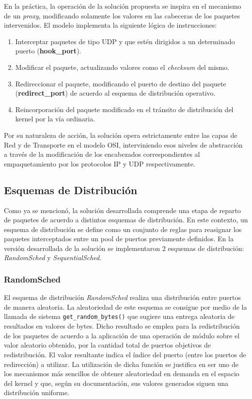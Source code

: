 En la práctica, la operación de la solución propuesta se inspira en el mecanismo de un \emph{proxy}, modificando solamente los valores en las cabeceras de los paquetes intervenidos. El modelo implementa la siguiente lógica de instrucciones:

\begin{enumerate}
\item Interceptar paquetes de tipo UDP y que estén dirigidos a un determinado puerto (\textbf{hook\_port}).
\item Modificar el paquete, actualizando valores como el \emph{checksum} del mismo.
\item Redireccionar el paquete, modificando el puerto de destino del paquete (\textbf{redirect\_port}) de acuerdo al esquema de distribución operativo.
\item Reincorporación del paquete modificado en el tránsito de distribución del kernel por la vía ordinaria.
\end{enumerate}

Por su naturaleza de acción, la solución opera estrictamente entre las capas de Red y de Transporte en el modelo OSI, interviniendo esos niveles de abstracción a través de la modificación de los encabezados correspondientes al empaquetamiento por los protocolos IP y UDP respectivamente.


\subsection{Esquemas de Distribución}
Como ya se mencionó, la solución desarrollada comprende una etapa de reparto de paquetes de acuerdo a distintos esquemas de distribución. En este contexto, un esquema de distribución se define como un conjunto de reglas para reasignar los paquetes interceptados entre un pool de puertos previamente definidos. En la versión desarrollada de la solución se implementaron 2 esquemas de distribución: \emph{RandomSched} y \emph{SequentialSched}.

\subsubsection{RandomSched}
El esquema de distribución \emph{RandomSched} realiza una distribución entre puertos de manera aleatoria. La aleatoriedad de este esquema se consigue por medio de la llamada de sistema \verb=get_random_bytes()= que sugiere una entrega aleatoria de resultados en valores de bytes. Dicho resultado se emplea para la redistribución de los paquetes de acuerdo a la aplicación de una operación de módulo sobre el valor aleatorio obtenido, por la cantidad total de puertos objetivos de redistribución. El valor resultante indica el índice del puerto (entre los puertos de redirección) a utilizar. La utilización de dicha función se justifica en ser uno de los mecanismos más sencillos de obtener aleatoriedad en demanda en el espacio del kernel y que, según su documentación, sus valores generados siguen una distribución uniforme.


